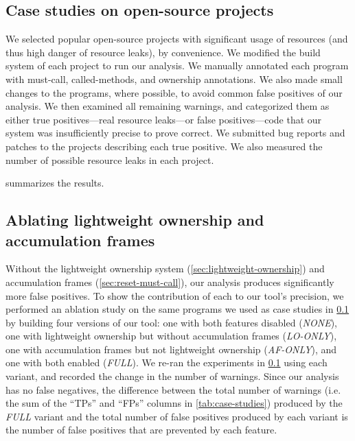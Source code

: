 \subsection{Case studies on open-source projects}
\label{sec:case-studies}

We selected  popular open-source projects with significant
usage of resources (and thus high danger of resource leaks), by
convenience.  We modified the build system of each project to run our
analysis. We manually annotated each program with must-call,
called-methods, and ownership annotations. We also
made small changes to the programs, where possible, to avoid
common false positives of our analysis. We then examined all
remaining warnings, and categorized them as either true
positives---real resource leaks---or false positives---code that our
system was insufficiently precise to prove correct. We submitted bug
reports and patches to the projects describing each true positive.
We also measured the number of possible resource leaks in each project.

 summarizes the results.


\subsection{Ablating lightweight ownership and accumulation frames}
\label{sec:ablation}

Without the lightweight ownership system (\cref{sec:lightweight-ownership}) and
accumulation frames (\cref{sec:reset-must-call}), our analysis produces significantly
more false positives. To show the contribution of each to our tool's precision,
we performed an ablation study on the same programs we used as case studies in
\cref{sec:case-studies} by building four versions of our tool: one with both
features disabled (\emph{NONE}), one with lightweight ownership but without
accumulation frames (\emph{LO-ONLY}), one with accumulation frames but not
lightweight ownership (\emph{AF-ONLY}), and one with both enabled (\emph{FULL}).
We re-ran the experiments in \cref{sec:case-studies} using each variant, and
recorded the change in the number of warnings. Since our analysis has no false
negatives, the difference between the total number of warnings (i.e. the sum of
the ``TPs'' and ``FPs'' columns in \cref{tab:case-studies}) produced by the \emph{FULL}
variant and the total number of false positives produced by each variant is
the number of false positives that are prevented by each feature.

